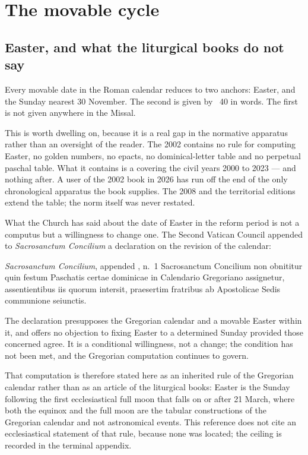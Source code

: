\section{The movable cycle}
\label{sec:movable}

\subsection{Easter, and what the liturgical books do not say}

Every movable date in the Roman calendar reduces to two anchors: Easter, and the Sunday nearest 30
November. The second is given by ~40 in words. The first is not given anywhere in the
Missal.

This is worth dwelling on, because it is a real gap in the normative apparatus rather than an
oversight of the reader. The 2002  contains no rule for computing
Easter, no golden numbers, no epacts, no dominical-letter table and no perpetual paschal table. What
it contains is a  covering the
civil years 2000 to 2023 --- and nothing after. A user of the 2002 book in 2026 has run off the end
of the only chronological apparatus the book supplies. The 2008  and the
territorial editions extend the table; the norm itself was never restated.

What the Church has said about the date of Easter in the reform period is not a computus but a
willingness to change one. The Second Vatican Council appended to \emph{Sacrosanctum Concilium} a
declaration on the revision of the calendar:

\begin{normtext}{\emph{Sacrosanctum Concilium}, appended , n.~1}
Sacrosanctum Concilium non obnititur quin festum Paschatis certae dominicae in Calendario Gregoriano
assignetur, assentientibus iis quorum intersit, praesertim fratribus ab Apostolicae Sedis communione
seiunctis.
\end{normtext}

The declaration presupposes the Gregorian calendar and a movable Easter within it, and offers no
objection to fixing Easter to a determined Sunday provided those concerned agree. It is a
conditional willingness, not a change; the condition has not been met, and the Gregorian
computation continues to govern.

That computation is therefore stated here as an inherited rule of the Gregorian calendar rather than
as an article of the liturgical books: Easter is the Sunday following the first ecclesiastical full
moon that falls on or after 21 March, where both the equinox and the full moon are the tabular
constructions of the Gregorian calendar and not astronomical events. This reference does not cite an
ecclesiastical statement of that rule, because none was located; the ceiling is recorded in the
terminal appendix.

